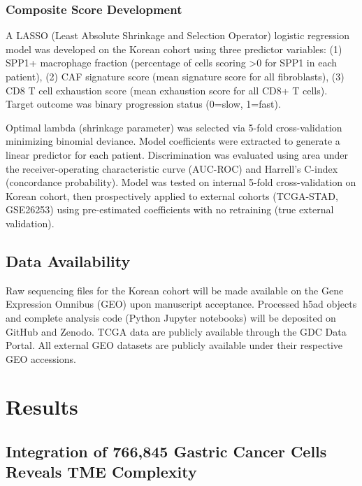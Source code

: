 \documentclass[12pt,twoside]{article}
\begin{document}
\subsubsection{Composite Score Development}

A LASSO (Least Absolute Shrinkage and Selection Operator) logistic regression model was developed on the Korean cohort using three predictor variables: (1) SPP1+ macrophage fraction (percentage of cells scoring >0 for SPP1 in each patient), (2) CAF signature score (mean signature score for all fibroblasts), (3) CD8 T cell exhaustion score (mean exhaustion score for all CD8+ T cells). Target outcome was binary progression status (0=slow, 1=fast).

Optimal lambda (shrinkage parameter) was selected via 5-fold cross-validation minimizing binomial deviance. Model coefficients were extracted to generate a linear predictor for each patient. Discrimination was evaluated using area under the receiver-operating characteristic curve (AUC-ROC) and Harrell's C-index (concordance probability). Model was tested on internal 5-fold cross-validation on Korean cohort, then prospectively applied to external cohorts (TCGA-STAD, GSE26253) using pre-estimated coefficients with no retraining (true external validation).

\subsection{Data Availability}

Raw sequencing files for the Korean cohort will be made available on the Gene Expression Omnibus (GEO) upon manuscript acceptance. Processed h5ad objects and complete analysis code (Python Jupyter notebooks) will be deposited on GitHub and Zenodo. TCGA data are publicly available through the GDC Data Portal. All external GEO datasets are publicly available under their respective GEO accessions.


\section{Results}

\subsection{Integration of 766,845 Gastric Cancer Cells Reveals TME Complexity}
\end{document}
